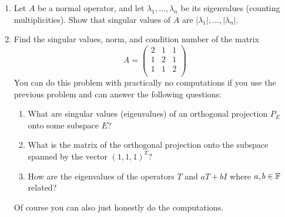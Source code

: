 \documentclass[../psets.tex]{subfiles}
\begin{document}
\begin{enumerate}[label={\textbf{4.\arabic*.}}]
    \item Let $A$ be a normal operator, and let $\lambda_1,\dots,\lambda_n$ be its eigenvalues (counting multiplicities). Show that singular values of $A$ are $|\lambda_1|,\dots,|\lambda_n|$.
    \item Find the singular values, norm, and condition number of the matrix
    \begin{equation*}
        A =
        \begin{pmatrix}
            2 & 1 & 1\\
            1 & 2 & 1\\
            1 & 1 & 2\\
        \end{pmatrix}
    \end{equation*}
    You can do this problem with practically no computations if you use the previous problem and can answer the following questions:
    \begin{enumerate}
        \item What are singular values (eigenvalues) of an orthogonal projection $P_E$ onto some subspace $E$?
        \item What is the matrix of the orthogonal projection onto the subspace spanned by the vector $(1,1,1)^T$?
        \item How are the eigenvalues of the operators $T$ and $aT+bI$ where $a,b\in\mathbb{F}$ related?
    \end{enumerate}
    Of course you can also just honestly do the computations.
\end{enumerate}
\end{document}
